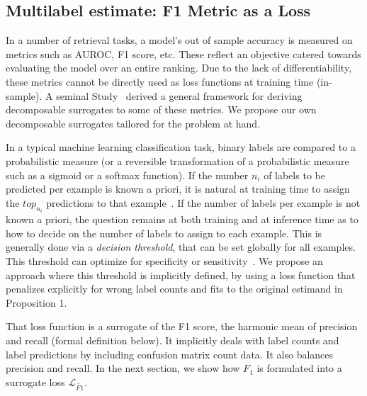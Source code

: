 \subsection{Multilabel estimate: F1 Metric as a Loss}
\label{section:background:metricsAsLosses}


In a number of retrieval tasks, a model's out of sample accuracy is measured on metrics such as AUROC, F1 score, etc. These reflect an objective catered towards evaluating the model over an entire ranking. Due to the lack of differentiability, these metrics cannot be directly used as loss functions at training time (in-sample). A seminal Study~\cite{optimizableLosses} derived a general framework for deriving decomposable surrogates to some of these metrics. We propose our own decomposable surrogates tailored for the problem at hand.

In a typical machine learning classification task, binary labels are compared to a probabilistic measure (or a reversible
transformation of a probabilistic measure such as a sigmoid or a softmax
function). If the number $n_i$ of labels to be predicted per
example is known a priori, it is natural at training time to assign the $top_{n_i}$ predictions
to that example~\cite{lossTopKError, topKmulticlassSVM}. If the number of
labels per example is not known a priori, the question remains at both training and at inference time
as to how to decide on the number of labels to assign to each
example. This is generally done via a \emph{decision threshold}, that can be set globally for all
examples. This threshold can optimize for specificity or
sensitivity~\cite{decisionThreshold}. We propose an approach where this threshold is implicitly defined, by using a loss function that penalizes explicitly for wrong label counts and fits to the original estimand in Proposition 1.

That loss function is a surrogate of the F1 score, the harmonic mean of precision and recall (formal definition below). It implicitly deals with label counts and label predictions by including confusion matrix count data. It also balances precision and recall. In the next section, we show how $F_1$ is formulated into a surrogate loss $\mathcal{L}_{\widetilde{\mathit{F1}}}$.




